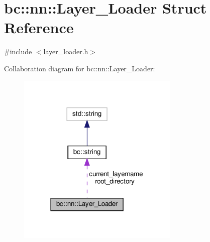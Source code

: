 \hypertarget{structbc_1_1nn_1_1Layer__Loader}{}\section{bc\+:\+:nn\+:\+:Layer\+\_\+\+Loader Struct Reference}
\label{structbc_1_1nn_1_1Layer__Loader}


{\ttfamily \#include $<$layer\+\_\+loader.\+h$>$}



Collaboration diagram for bc\+:\+:nn\+:\+:Layer\+\_\+\+Loader\+:\nopagebreak
\begin{figure}[H]
\begin{center}
\leavevmode
\includegraphics[width=218pt]{structbc_1_1nn_1_1Layer__Loader__coll__graph}
\end{center}
\end{figure}
